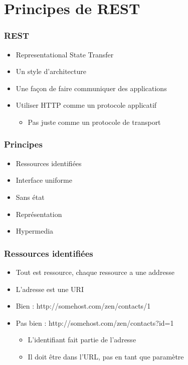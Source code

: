 \section{Principes de REST}


\begin{frame}
 \frametitle{REST}
 \begin{itemize}
  \item Representational State Transfer
  \item Un style d'architecture
  \item Une façon de faire communiquer des applications
  \item Utiliser HTTP comme un protocole applicatif
  \begin{itemize}
   \item Pas juste comme un protocole de transport
  \end{itemize}
 \end{itemize}
\end{frame}

\begin{frame}
 \frametitle{Principes}
 
 \begin{itemize}
  \item Ressources identifiées
  \item Interface uniforme
  \item Sans état
  \item Représentation
  \item Hypermedia
 \end{itemize} 

\end{frame}

\begin{frame}
 \frametitle{Ressources identifiées}
 
 \begin{itemize}
  \item Tout est ressource, chaque ressource a une addresse
  \item L'adresse est une URI
  \item Bien : http://somehost.com/zen/contacts/1
  \item Pas bien : http://somehost.com/zen/contacts?id=1
  \begin{itemize}
   \item L'identifiant fait partie de l'adresse
   \item Il doit être dans l'URL, pas en tant que paramètre
  \end{itemize}
 \end{itemize} 

\end{frame}

